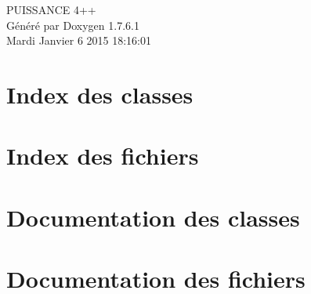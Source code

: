 \documentclass[a4paper]{book}
\begin{document}
\hypersetup{pageanchor=false,citecolor=blue}
\begin{titlepage}
\vspace*{7cm}
\begin{center}
{\Large \-P\-U\-I\-S\-S\-A\-N\-C\-E 4++ }\\
\vspace*{1cm}
{\large \-Généré par Doxygen 1.7.6.1}\\
\vspace*{0.5cm}
{\small Mardi Janvier 6 2015 18:16:01}\\
\end{center}
\end{titlepage}
\clearemptydoublepage
{}
\tableofcontents
\clearemptydoublepage
{}
\hypersetup{pageanchor=true,citecolor=blue}
\chapter{\-Index des classes}

\chapter{\-Index des fichiers}

\chapter{\-Documentation des classes}


\chapter{\-Documentation des fichiers}

















\printindex
\end{document}
